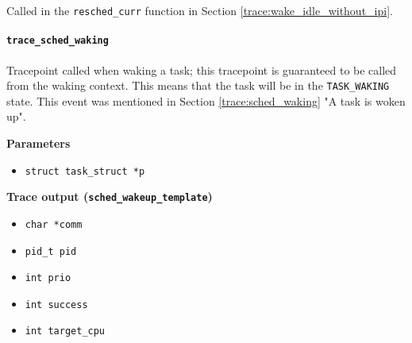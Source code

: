 Called in the \verb|resched_curr| function in Section \ref{trace:wake_idle_without_ipi}.

\paragraph{\texttt{trace\_sched\_waking}}
Tracepoint called when waking a task; this tracepoint is guaranteed to be called from the waking context. This means that the task will be in the \verb|TASK_WAKING| state.
This event was mentioned in Section \ref{trace:sched_waking} "A task is woken up".

\textbf{Parameters}
\begin{itemize}
    \item \verb|struct task_struct *p|
\end{itemize}

\textbf{Trace output (\texttt{sched\_wakeup\_template})}
\begin{itemize}
    \item \verb|char *comm|
    \item \verb|pid_t pid|
    \item \verb|int prio|
    \item \verb|int success|
    \item \verb|int target_cpu|
\end{itemize}


